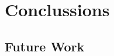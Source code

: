 \documentclass{llncs}
\begin{document}
\section{Conclussions}
\subsection{Future Work}

% 
% 
% 
% 
% 
\end{document}
